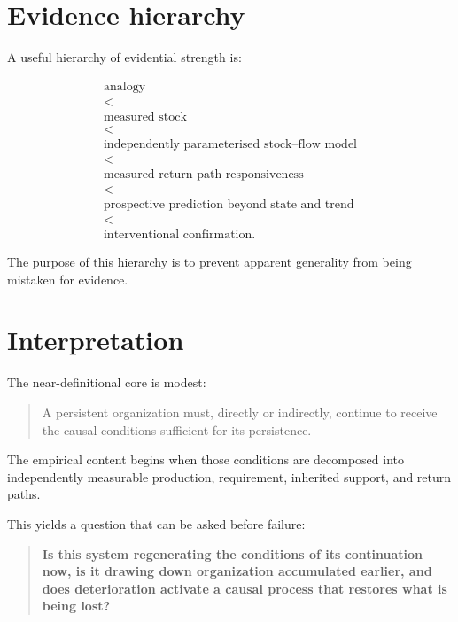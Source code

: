 \documentclass[11pt,a4paper]{article}
\begin{document}
\section{Evidence hierarchy}

A useful hierarchy of evidential strength is:

\begin{equation}
\boxed{
\begin{gathered}
\text{analogy}\\
<\\
\text{measured stock}\\
<\\
\text{independently parameterised stock--flow model}\\
<\\
\text{measured return-path responsiveness}\\
<\\
\text{prospective prediction beyond state and trend}\\
<\\
\text{interventional confirmation}.
\end{gathered}
}
\label{eq:evidence-hierarchy}
\end{equation}

The purpose of this hierarchy is to prevent apparent generality from being mistaken for evidence.

\section{Interpretation}

The near-definitional core is modest:

\begin{quote}
A persistent organization must, directly or indirectly, continue to receive the causal conditions sufficient for its persistence.
\end{quote}

The empirical content begins when those conditions are decomposed into independently measurable production, requirement, inherited support, and return paths.

This yields a question that can be asked before failure:

\begin{quote}
\textbf{Is this system regenerating the conditions of its continuation now, is it drawing down organization accumulated earlier, and does deterioration activate a causal process that restores what is being lost?}
\end{quote}
\end{document}
